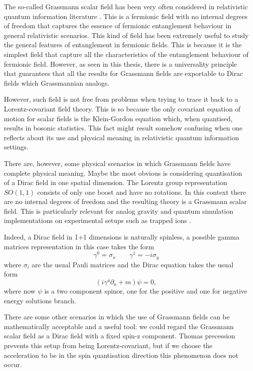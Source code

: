 The so-called Grassmann scalar field  has been very often considered in relativistic quantum information literature . This is a fermionic field
with no internal degrees of freedom that captures the essence of fermionic entanglement behaviour in general relativistic scenarios. This kind of field has been extremely useful to study the general features of entanglement in fermionic fields. This is because it is the simplest field that capture all the characteristics of the entanglement behaviour of fermionic field. However, as seen in this thesis, there is a universality principle that guarantees that all the results for Grassmann fields are exportable to Dirac fields which Grassmannian analogs.

However, such field is not free from problems when trying to trace it back to a Lorentz-covariant field theory. This is so because the only covariant equation of motion for scalar fields is the Klein-Gordon equation which, when quantised, results in bosonic statistics. This fact might result somehow confusing when one reflects about its use and physical meaning in relativistic quantum information settings.

There are, however, some physical scenarios in which Grassmann fields have complete physical meaning. Maybe the most obvious is considering quantisation of a Dirac field in one spatial dimension. The Lorentz group representation $SO(1,1)$ consists of only one boost and have no rotations. In this context  there are no internal degrees of freedom and the resulting theory is a Grassmann scalar field. This is particularly relevant for analog
gravity and quantum simulation implementations on experimental setups such as trapped ions \cite{SimulJuan}.


Indeed, a Dirac field in 1+1 dimensions  is naturally spinless, a possible gamma matrices representation in this case takes the form
\begin{equation}
\gamma^0=\sigma_x\qquad\gamma^1=-i\sigma_y
\end{equation}
where $\sigma_i$ are the usual Pauli matrices and the Dirac equation takes the usual form
\begin{equation}\label{Dirac3}
(i\gamma^{a}\partial_{a}+m)\psi=0,
\end{equation}
where now $\psi$ is a two component spinor, one for the positive and one for negative energy solutions branch. 

There are some other scenarios in which the use of Grassmann fields can be mathematically acceptable and a useful tool: we could regard the Grassmann scalar field as a Dirac field with a fixed spin-z component. Thomas precession prevents this setup from being Lorentz-covariant,
but if we choose the acceleration to be in the spin quantisation direction this phenomenon does not occur.




\cleardoublepage